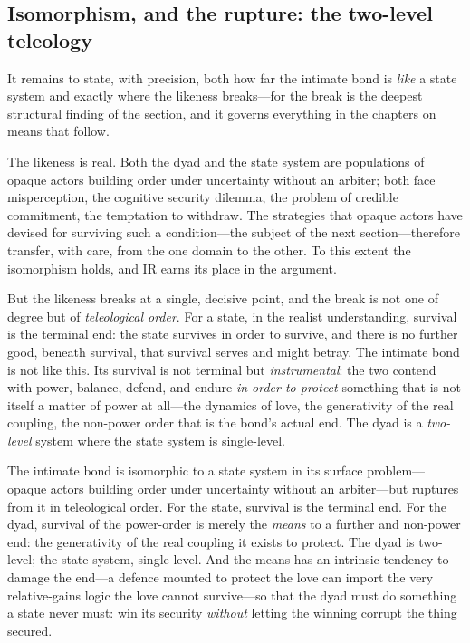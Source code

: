 \subsection{Isomorphism, and the rupture: the two-level teleology}
\label{p17:sub:ir-rupture}

It remains to state, with precision, both how far the intimate bond is \emph{like} a state system and exactly where the likeness breaks---for the break is the deepest structural finding of the section, and it governs everything in the chapters on means that follow.

The likeness is real. Both the dyad and the state system are populations of opaque actors building order under uncertainty without an arbiter; both face misperception, the cognitive security dilemma, the problem of credible commitment, the temptation to withdraw. The strategies that opaque actors have devised for surviving such a condition---the subject of the next section---therefore transfer, with care, from the one domain to the other. To this extent the isomorphism holds, and IR earns its place in the argument.

But the likeness breaks at a single, decisive point, and the break is not one of degree but of \emph{teleological order}. For a state, in the realist understanding, survival is the terminal end: the state survives in order to survive, and there is no further good, beneath survival, that survival serves and might betray. The intimate bond is not like this. Its survival is not terminal but \emph{instrumental}: the two contend with power, balance, defend, and endure \emph{in order to protect} something that is not itself a matter of power at all---the dynamics of love, the generativity of the real coupling, the non-power order that is the bond's actual end. The dyad is a \emph{two-level} system where the state system is single-level.

\begin{claim}
The intimate bond is isomorphic to a state system in its surface problem---opaque actors building order under uncertainty without an arbiter---but ruptures from it in teleological order. For the state, survival is the terminal end. For the dyad, survival of the power-order is merely the \emph{means} to a further and non-power end: the generativity of the real coupling it exists to protect. The dyad is two-level; the state system, single-level. And the means has an intrinsic tendency to damage the end---a defence mounted to protect the love can import the very relative-gains logic the love cannot survive---so that the dyad must do something a state never must: win its security \emph{without} letting the winning corrupt the thing secured.
\end{claim}

